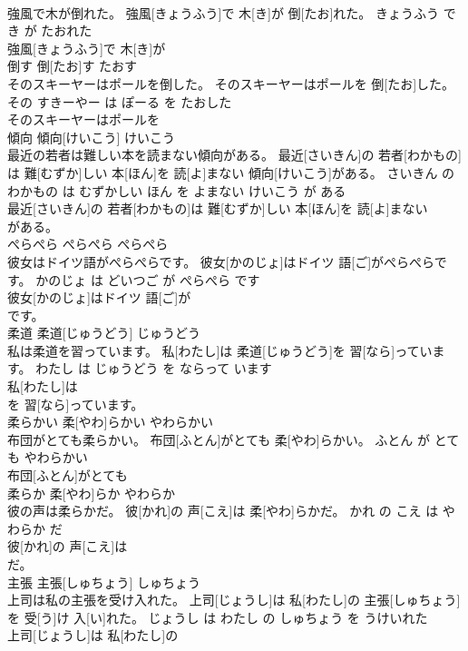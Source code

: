 \documentclass[8pt]{extreport}
\begin{document}
\begin{CJK}{UTF8}{min}
\\	強風で木が倒れた。	強風[きょうふう]で 木[き]が 倒[たお]れた。	きょうふう で き が たおれた	
\\	強風[きょうふう]で 木[き]が
\\	倒す	倒[たお]す	たおす	
\\	そのスキーヤーはポールを倒した。	そのスキーヤーはポールを 倒[たお]した。	その すきーやー は ぽーる を たおした	
\\	そのスキーヤーはポールを
\\	傾向	傾向[けいこう]	けいこう	
\\	最近の若者は難しい本を読まない傾向がある。	最近[さいきん]の 若者[わかもの]は 難[むずか]しい 本[ほん]を 読[よ]まない 傾向[けいこう]がある。	さいきん の わかもの は むずかしい ほん を よまない けいこう が ある	
\\	最近[さいきん]の 若者[わかもの]は 難[むずか]しい 本[ほん]を 読[よ]まない
\\	がある。			
\\	ぺらぺら	ぺらぺら	ぺらぺら	
\\	彼女はドイツ語がぺらぺらです。	彼女[かのじょ]はドイツ 語[ご]がぺらぺらです。	かのじょ は どいつご が ぺらぺら です	
\\	彼女[かのじょ]はドイツ 語[ご]が
\\	です。			
\\	柔道	柔道[じゅうどう]	じゅうどう	
\\	私は柔道を習っています。	私[わたし]は 柔道[じゅうどう]を 習[なら]っています。	わたし は じゅうどう を ならって います	
\\	私[わたし]は
\\	を 習[なら]っています。			
\\	柔らかい	柔[やわ]らかい	やわらかい	
\\	布団がとても柔らかい。	布団[ふとん]がとても 柔[やわ]らかい。	ふとん が とても やわらかい	
\\	布団[ふとん]がとても
\\	柔らか	柔[やわ]らか	やわらか	
\\	彼の声は柔らかだ。	彼[かれ]の 声[こえ]は 柔[やわ]らかだ。	かれ の こえ は やわらか だ	
\\	彼[かれ]の 声[こえ]は
\\	だ。			
\\	主張	主張[しゅちょう]	しゅちょう	
\\	上司は私の主張を受け入れた。	上司[じょうし]は 私[わたし]の 主張[しゅちょう]を 受[う]け 入[い]れた。	じょうし は わたし の しゅちょう を うけいれた	
\\	上司[じょうし]は 私[わたし]の

\end{CJK}
\end{document}
